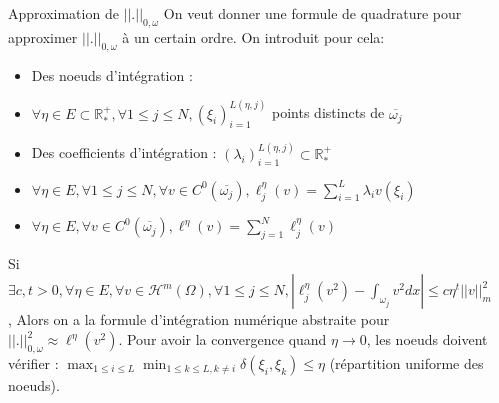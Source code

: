 \documentclass[final]{beamer}
\newlength{\onecolwid}
\newlength{\twocolwid}
\begin{document}
\begin{frame}[t]
\begin{columns}[t]
\begin{column}{\twocolwid}
\begin{columns}[t,totalwidth=\twocolwid]
\begin{column}{\onecolwid}
\begin{block}{}
\end{block}


\end{column} %

\begin{column}{\onecolwid}\vspace{-.6in} %

\begin{block}{Approximation de $||.||_{0,\omega}$}
On veut donner une formule de quadrature pour approximer $||.||_{0,\omega}$ à un certain ordre. On introduit pour cela:
\begin{itemize}
\item Des noeuds d'intégration : \item $\forall \eta \in E \subset \mathbb{R}^+_* , \forall 1\leq j\leq N , (\xi_i)_{i=1}^{L(\eta,j)}$  points distincts de $\overline{\omega_j}$
\item Des coefficients d'intégration : $(\lambda_i)_{i=1}^{L(\eta,j)} \subset \mathbb{R}_*^+$
\item $\forall \eta \in E, \forall 1\leq j \leq N, \forall v \in C^0(\overline{\omega_j}), \ell^{\eta}_j(v) = \sum_{i=1}^L{\lambda_iv(\xi_i)}$
\item $\forall \eta \in E, \forall v \in C^0(\overline{\omega_j}), \ell^{\eta}(v) = \sum_{j=1}^N{\ell_j^{\eta}(v)}$
\end{itemize}
Si $\exists c,t >0, \forall \eta \in E , \forall v \in \mathcal{H}^m(\Omega),\forall 1 \leq j \leq N , | \ell^{\eta}_j(v^2) - \int_{\omega_j}{v^2dx}| \leq c\eta^t||v||^2_{m,\Omega}$ 
, Alors on a la formule d'intégration numérique abstraite pour $||.||_{0,\omega}^2 \approx \ell^{\eta}(v^2)$. Pour avoir la convergence quand $\eta\to  0$, les noeuds doivent vérifier : $\max_{1 \leq i \leq L}{\min_{1 \leq k \leq L , k \neq i}{\delta(\xi_i,\xi_k)}}\leq \eta$ (répartition uniforme des noeuds).
\end{block}


\end{column}
\end{columns}
\end{column}
\end{columns}
\end{frame}
\end{document}
